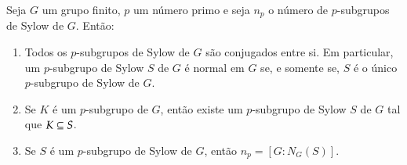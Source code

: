 \begin{teorema}\label{segundo_teorema_de_sylow}
	Seja $G$ um grupo finito, $p$ um n\'umero primo e seja $n_p$ o n\'umero de $p$-subgrupos de Sylow de $G$. Ent\~ao:
	\begin{enumerate}[label=({\roman*})]
		\item Todos os $p$-subgrupos de Sylow de $G$ s\~ao conjugados entre si. Em particular, um $p$-subgrupo de Sylow $S$ de $G$ \'e normal em $G$ se, e somente se, $S$ \'e o \'unico $p$-subgrupo de Sylow de $G$.

		\item Se $K$ \'e um $p$-subgrupo de $G$, ent\~ao existe um $p$-subgrupo de Sylow $S$ de $G$ tal que $K \subseteq S$.

		\item Se $S$ \'e um $p$-subgrupo de Sylow de $G$, ent\~ao $n_p = [G : N_G(S)]$.
	\end{enumerate}
\end{teorema}
